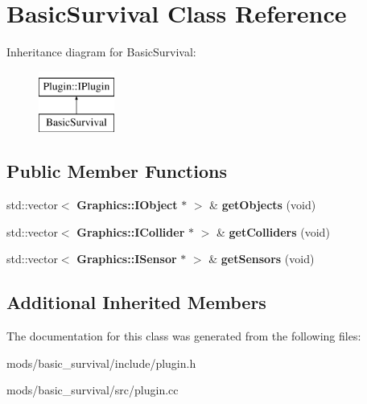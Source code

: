 \section{Basic\+Survival Class Reference}
\label{class_basic_survival}
Inheritance diagram for Basic\+Survival\+:\begin{figure}[H]
\begin{center}
\leavevmode
\includegraphics[height=2.000000cm]{class_basic_survival}
\end{center}
\end{figure}
\subsection*{Public Member Functions}
\begin{DoxyCompactItemize}
\item 
std\+::vector$<$ {\bf Graphics\+::\+I\+Object} $\ast$ $>$ \& {\bfseries get\+Objects} (void)\label{class_basic_survival_ae9076786eb5100c347ae4b8653d4eda3}

\item 
std\+::vector$<$ {\bf Graphics\+::\+I\+Collider} $\ast$ $>$ \& {\bfseries get\+Colliders} (void)\label{class_basic_survival_aae2f585829a266b8a47de45e9e1109e7}

\item 
std\+::vector$<$ {\bf Graphics\+::\+I\+Sensor} $\ast$ $>$ \& {\bfseries get\+Sensors} (void)\label{class_basic_survival_a496e2fa34d0e7c23e0db7e7ac86fc214}

\end{DoxyCompactItemize}
\subsection*{Additional Inherited Members}


The documentation for this class was generated from the following files\+:\begin{DoxyCompactItemize}
\item 
mods/basic\+\_\+survival/include/plugin.\+h\item 
mods/basic\+\_\+survival/src/plugin.\+cc\end{DoxyCompactItemize}
